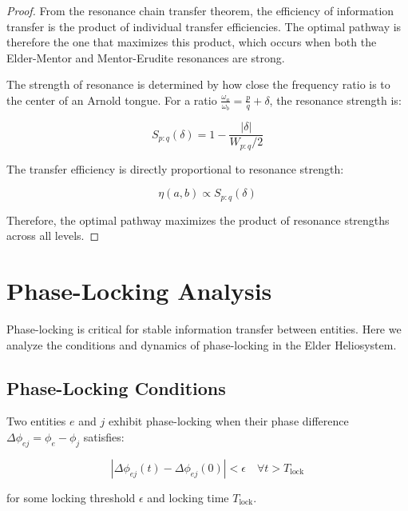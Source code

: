 \begin{proof}
From the resonance chain transfer theorem, the efficiency of information transfer is the product of individual transfer efficiencies. The optimal pathway is therefore the one that maximizes this product, which occurs when both the Elder-Mentor and Mentor-Erudite resonances are strong.

The strength of resonance is determined by how close the frequency ratio is to the center of an Arnold tongue. For a ratio $\frac{\omega_a}{\omega_b} = \frac{p}{q} + \delta$, the resonance strength is:

\begin{equation}
S_{p:q}(\delta) = 1 - \frac{|\delta|}{W_{p:q}/2}
\end{equation}

The transfer efficiency is directly proportional to resonance strength:

\begin{equation}
\eta(a, b) \propto S_{p:q}(\delta)
\end{equation}

Therefore, the optimal pathway maximizes the product of resonance strengths across all levels.
\end{proof}

\section{Phase-Locking Analysis}

Phase-locking is critical for stable information transfer between entities. Here we analyze the conditions and dynamics of phase-locking in the Elder Heliosystem.

\subsection{Phase-Locking Conditions}

\begin{definition}
Two entities $e$ and $j$ exhibit phase-locking when their phase difference $\Delta\phi_{ej} = \phi_e - \phi_j$ satisfies:

\begin{equation}
|\Delta\phi_{ej}(t) - \Delta\phi_{ej}(0)| < \epsilon \quad \forall t > T_{\text{lock}}
\end{equation}

for some locking threshold $\epsilon$ and locking time $T_{\text{lock}}$.
\end{definition}

